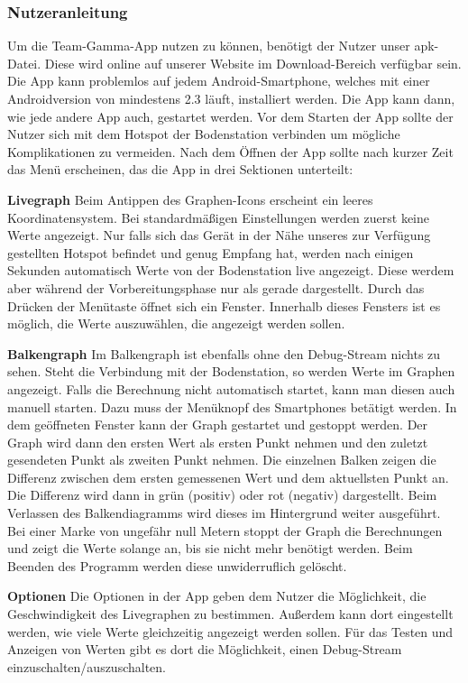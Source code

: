 \subsubsection{Nutzeranleitung}
Um die Team-Gamma-App nutzen zu können, benötigt der Nutzer unser apk-Datei. Diese wird online auf unserer Website im Download-Bereich verfügbar sein. Die App kann problemlos auf jedem Android-Smartphone, welches mit einer Androidversion von mindestens 2.3 läuft, installiert werden. Die App kann dann, wie jede andere App auch, gestartet werden. Vor dem Starten der App sollte der Nutzer sich mit dem Hotspot der Bodenstation verbinden um mögliche Komplikationen zu vermeiden. Nach dem Öffnen der App sollte nach kurzer Zeit das Menü erscheinen, das die App in drei Sektionen unterteilt: 

\begin{description}
	\item \textbf{Livegraph}
	Beim Antippen des Graphen-Icons erscheint ein leeres Koordinatensystem. Bei standardmäßigen Einstellungen werden zuerst keine Werte angezeigt. Nur falls sich das Gerät in der Nähe unseres zur Verfügung gestellten Hotspot befindet und genug Empfang hat, werden nach einigen Sekunden automatisch Werte von der Bodenstation live angezeigt. Diese werdem aber während der Vorbereitungsphase nur als gerade dargestellt. Durch das Drücken der Menütaste öffnet sich ein Fenster. Innerhalb dieses Fensters ist es möglich, die Werte auszuwählen, die angezeigt werden sollen.
	
	\item \textbf{Balkengraph}
	Im Balkengraph ist ebenfalls ohne den Debug-Stream nichts zu sehen. Steht die Verbindung mit der Bodenstation, so werden Werte im Graphen angezeigt. Falls die Berechnung nicht automatisch startet, kann man diesen auch manuell starten. Dazu muss der Menüknopf des Smartphones betätigt werden. In dem geöffneten Fenster kann der Graph gestartet und gestoppt werden. Der Graph wird dann den ersten Wert als ersten Punkt nehmen und den zuletzt gesendeten Punkt als zweiten Punkt nehmen. Die einzelnen Balken zeigen die Differenz zwischen dem ersten gemessenen Wert und dem aktuellsten Punkt an. Die Differenz wird dann in grün (positiv) oder rot (negativ) dargestellt. Beim Verlassen des Balkendiagramms wird dieses im Hintergrund weiter ausgeführt. Bei einer Marke von ungefähr null Metern stoppt der Graph die Berechnungen und zeigt die Werte solange an, bis sie nicht mehr benötigt werden. Beim Beenden des Programm werden diese unwiderruflich gelöscht.
	
	\item \textbf{Optionen}
	Die Optionen in der App geben dem Nutzer die Möglichkeit, die Geschwindigkeit des Livegraphen zu bestimmen. Außerdem kann dort eingestellt werden, wie viele Werte gleichzeitig angezeigt werden sollen. Für das Testen und Anzeigen von Werten gibt es dort die Möglichkeit, einen Debug-Stream einzuschalten/auszuschalten.
\end{description}
